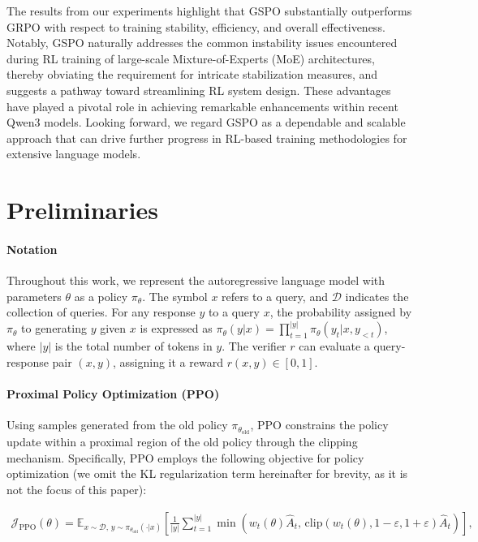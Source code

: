 The results from our experiments highlight that GSPO substantially outperforms GRPO with respect to training stability, efficiency, and overall effectiveness. Notably, GSPO naturally addresses the common instability issues encountered during RL training of large-scale Mixture-of-Experts (MoE) architectures, thereby obviating the requirement for intricate stabilization measures, and suggests a pathway toward streamlining RL system design. These advantages have played a pivotal role in achieving remarkable enhancements within recent Qwen3 models. Looking forward, we regard GSPO as a dependable and scalable approach that can drive further progress in RL-based training methodologies for extensive language models.

\section{Preliminaries}

\paragraph{Notation}
Throughout this work, we represent the autoregressive language model with parameters $\theta$ as a policy $\pi_\theta$. The symbol $x$ refers to a query, and $\mathcal{D}$ indicates the collection of queries. For any response $y$ to a query $x$, the probability assigned by $\pi_\theta$ to generating $y$ given $x$ is expressed as $\pi_\theta (y | x)=\prod_{t=1}^{|y|} \pi_\theta (y_t | x, y_{<t} )$, where $|y|$ is the total number of tokens in $y$. The verifier $r$ can evaluate a query-response pair $(x, y)$, assigning it a reward $r(x, y) \in [ 0, 1 ]$.

\paragraph{Proximal Policy Optimization (PPO)} Using samples generated from the old policy $\pi_{\theta_\text{old}}$, PPO \citep{ppo} constrains the policy update within a proximal region of the old policy through the clipping mechanism. Specifically, PPO employs the following objective for policy optimization (we omit the KL regularization term hereinafter for brevity, as it is not the focus of this paper):

\begin{align}
\mathcal{J}_\text{PPO}(\theta) = \mathbb{E}_{ x \sim \mathcal{D},\, y \sim \pi_{\theta_\text{old}}( \cdot | x) }
\left[ \frac{1}{|y|} \sum_{t=1}^{|y|} 
\min \left( w_{t}(\theta) \widehat{A}_{t},  \, \mathrm{clip} \left( w_{t}(\theta), 1 - {\varepsilon}, 1 + {\varepsilon}\right) \widehat{A}_{t} \right)
\right],
\end{align}

